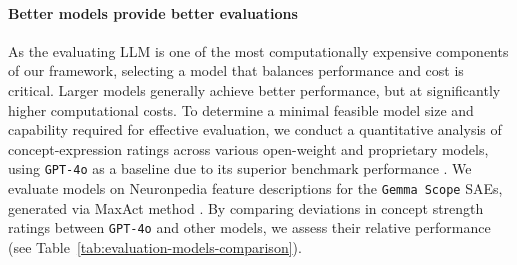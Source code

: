 \paragraph{Better models provide better evaluations}
As the evaluating LLM is one of the most computationally expensive components of our framework, selecting a model that balances performance and cost is critical. Larger models generally achieve better performance, but at significantly higher computational costs. To determine a minimal feasible model size and capability required for effective evaluation, we conduct a quantitative analysis of concept-expression ratings across various open-weight and proprietary models, using \texttt{GPT-4o} as a baseline due to its superior benchmark performance \cite{openai2024gpt4o}. 
We evaluate models on Neuronpedia \cite{neuronpedia} feature descriptions for the \texttt{Gemma Scope} SAEs, generated via MaxAct method \cite{rajamanoharan2024jumpingaheadimprovingreconstruction}. By comparing deviations in concept strength ratings between \texttt{GPT-4o} and other models, we assess their relative performance (see Table~\ref{tab:evaluation-models-comparison}).

